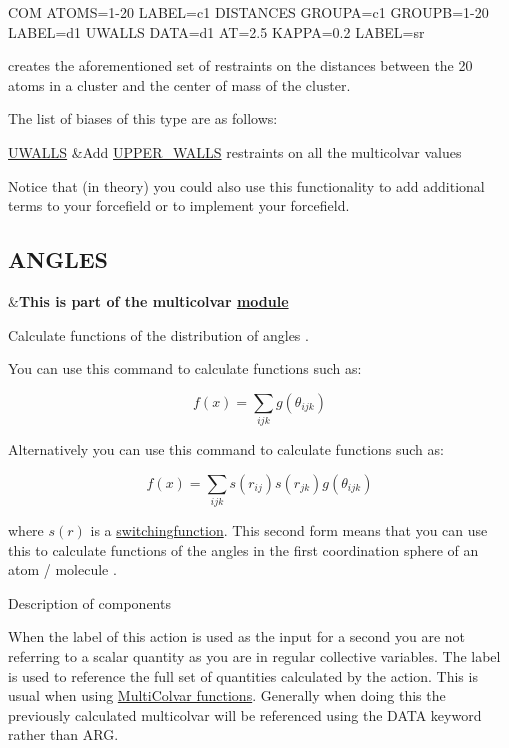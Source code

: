 \begin{DoxyVerb}COM ATOMS=1-20 LABEL=c1
DISTANCES GROUPA=c1 GROUPB=1-20 LABEL=d1
UWALLS DATA=d1 AT=2.5 KAPPA=0.2 LABEL=sr
\end{DoxyVerb}


creates the aforementioned set of restraints on the distances between the 20 atoms in a cluster and the center of mass of the cluster.

The list of biases of this type are as follows\+:

\begin{TabularC}{2}
\hline
\hyperlink{UWALLS}{U\+W\+A\+L\+L\+S}  &Add \hyperlink{UPPER_WALLS}{U\+P\+P\+E\+R\+\_\+\+W\+A\+L\+L\+S} restraints on all the multicolvar values  \\
\end{TabularC}


Notice that (in theory) you could also use this functionality to add additional terms to your forcefield or to implement your forcefield. \hypertarget{ANGLES}{}\subsection{A\+N\+G\+L\+E\+S}\label{ANGLES}
\begin{TabularC}{2}
\hline
&{\bfseries  This is part of the multicolvar \hyperlink{mymodules}{module }}   \\
\end{TabularC}
Calculate functions of the distribution of angles .

You can use this command to calculate functions such as\+:

\[ f(x) = \sum_{ijk} g( \theta_{ijk} ) \]

Alternatively you can use this command to calculate functions such as\+:

\[ f(x) = \sum_{ijk} s(r_{ij})s(r_{jk}) g(\theta_{ijk}) \]

where $s(r)$ is a \hyperlink{switchingfunction}{switchingfunction}. This second form means that you can use this to calculate functions of the angles in the first coordination sphere of an atom / molecule \cite{lj-recon}.

\begin{DoxyParagraph}{Description of components}

\end{DoxyParagraph}
When the label of this action is used as the input for a second you are not referring to a scalar quantity as you are in regular collective variables. The label is used to reference the full set of quantities calculated by the action. This is usual when using \hyperlink{mcolv_multicolvarfunction}{Multi\+Colvar functions}. Generally when doing this the previously calculated multicolvar will be referenced using the D\+A\+T\+A keyword rather than A\+R\+G.

